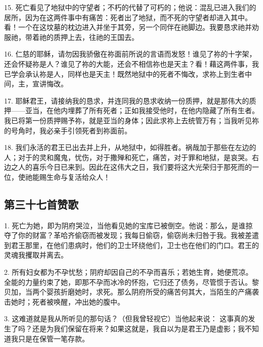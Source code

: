 15. 死亡看见了地狱中的守望者；不朽的代替了可朽的；他说：混乱已进入我们的居所，因为在这两件事中有痛苦：死者出了地狱，而不死的守望者却进入其中。看！一个在这坟墓的枕边进入并坐于其旁，另一个同伴在祂脚边。我要恳求祂并劝服祂，带着祂的质押上去，往祂的王国去。\par

16. 仁慈的耶稣，请勿因我骄傲在祢面前所说的言语而发怒！谁见了祢的十字架，还会怀疑祢是人？谁见了祢的大能，还会不相信祢也是天主？看！藉这两件事，我已学会承认祢是人，同样也是天主！既然地狱中的死者不悔改，求祢上到生者中间，主，宣讲悔改。\par

17. 耶稣君王，请接纳我的恳求，并连同我的恳求收纳一份质押，就是那伟大的质押——亚当，在他内埋葬了所有死者；正如我接受他时，在他内隐藏了所有生者。我已将第一份质押赐予祢，就是亚当的身体；因此求祢上去统管万有；当我听见祢的号角时，我必亲手引领死者到祢面前。\par

18. 我们永活的君王已出去并上升，从地狱中，如得胜者。祸哉加于那些在左边的人；对于的灵和魔鬼，忧伤，对于撒殚和死亡，痛苦，对于罪和地狱，是哀哭。右边之人的喜乐今日已来到。因此在这伟大之日，我们要将这大光荣归于那死而的一位，使祂能赐生命与复活给众人！\par


\subsection{第三十七首赞歌}

1. 死亡为她，即为阴府哭泣，当他看见她的宝库已被倒空。他说：那么，是谁掠夺了你的财富？革哈齐偷窃而被发现；我每日偷窃，偷窃尚未归咎于我。我被差遣到君王那里，在他们患病时，他们的卫士环绕他们，卫士也在他们的门口。君王的灵魂我攫取并离去。\par

2. 所有妇女都为不孕忧愁；阴府却因自己的不孕而喜乐；若她生育，她便荒凉。全能的力量约束了她，即那不孕而冰冷的怀抱，它归还了债务，尽管惯于否认。黎贝加，当两个婴孩折磨她时，求死。那么阴府所受的痛苦何其大，当陌生的产痛袭击她时；死者被唤醒，冲出她的腹中。\par

3. 这难道就是我从所听见的那句话？（但我曾轻视它）当他起来说： 这事真的发生了吗？还是为我们保留在将来？如果这就是，我自以为是君王乃是虚影；我不知道我只是在保管一笔存款。\par

